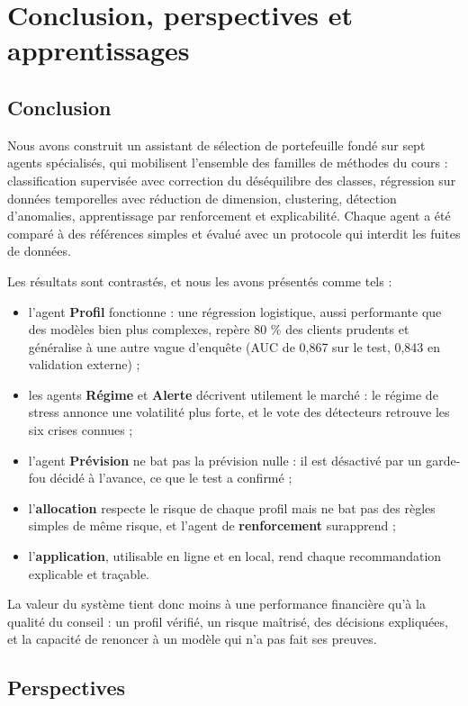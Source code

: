 \section{Conclusion, perspectives et apprentissages}
\label{sec:conclusion}

\subsection{Conclusion}

Nous avons construit un assistant de sélection de portefeuille fondé sur sept agents spécialisés, qui mobilisent l'ensemble des familles de méthodes du cours : classification supervisée avec correction du déséquilibre des classes, régression sur données temporelles avec réduction de dimension, clustering, détection d'anomalies, apprentissage par renforcement et explicabilité. Chaque agent a été comparé à des références simples et évalué avec un protocole qui interdit les fuites de données.

Les résultats sont contrastés, et nous les avons présentés comme tels :
\begin{itemize}
  \item l'agent \textbf{Profil} fonctionne : une régression logistique, aussi performante que des modèles bien plus complexes, repère 80 \% des clients prudents et généralise à une autre vague d'enquête (AUC de 0,867 sur le test, 0,843 en validation externe) ;
  \item les agents \textbf{Régime} et \textbf{Alerte} décrivent utilement le marché : le régime de stress annonce une volatilité plus forte, et le vote des détecteurs retrouve les six crises connues ;
  \item l'agent \textbf{Prévision} ne bat pas la prévision nulle : il est désactivé par un garde-fou décidé à l'avance, ce que le test a confirmé ;
  \item l'\textbf{allocation} respecte le risque de chaque profil mais ne bat pas des règles simples de même risque, et l'agent de \textbf{renforcement} surapprend ;
  \item l'\textbf{application}, utilisable en ligne et en local, rend chaque recommandation explicable et traçable.
\end{itemize}
La valeur du système tient donc moins à une performance financière qu'à la qualité du conseil : un profil vérifié, un risque maîtrisé, des décisions expliquées, et la capacité de renoncer à un modèle qui n'a pas fait ses preuves.

\subsection{Perspectives}

